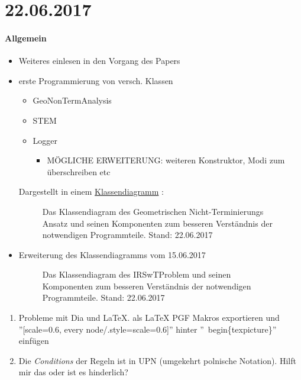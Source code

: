 \section*{22.06.2017}

\paragraph{Allgemein}
\begin{itemize}
	\item Weiteres einlesen in den Vorgang des Papers
	\item erste Programmierung von versch. Klassen
		\begin{itemize}
			\item GeoNonTermAnalysis
			\item STEM
			\item Logger
				\begin{itemize}
					\item MÖGLICHE ERWEITERUNG: weiteren Konstruktor, Modi zum überschreiben etc
				\end{itemize}
		\end{itemize}
		Dargestellt in einem \hyperref[22.06.2017:: GeoNonTerm-classdiagram]{Klassendiagramm} :
		\begin{figure}[H]
			\centering
			
			\caption{Das Klassendiagram des Geometrischen Nicht-Terminierungs Ansatz und seinen Komponenten zum besseren Verständnis der notwendigen Programmteile. Stand: 22.06.2017}
			\label{22.06.2017:: GeoNonTerm-classdiagram}
		\end{figure}
	
	\item Erweiterung des Klassendiagramms vom 15.06.2017 
		\begin{figure}[H]
			\centering
			
			\caption{Das Klassendiagram des IRSwTProblem und seinen Komponenten zum besseren Verständnis der notwendigen Programmteile. Stand: 22.06.2017}
			\label{22.06.2017:: IRSwTProblem-classdiagram}
		\end{figure}
\end{itemize}

\begin{enumerate}
	\item Probleme mit Dia und LaTeX. \answer als LaTeX PGF Makros exportieren und ''[scale=0.6, every node/.style={scale=0.6}]'' hinter ''\ begin\{texpicture\}'' einfügen
	\item Die \emph{Conditions} der Regeln ist in UPN (umgekehrt polnische Notation). Hilft mir das oder ist es hinderlich?
\end{enumerate}